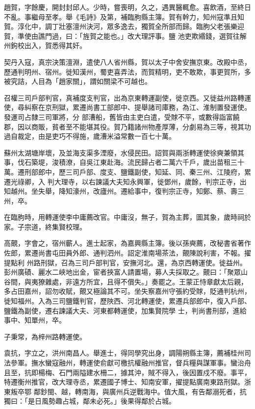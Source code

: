 \begin{pinyinscope}
 趙賀，字餘慶，開封封邱人。少時，嘗喪明，久之，遇異醫輒愈。喜飲酒，至終日不亂。事繼母至孝。舉《毛詩》及第，補臨朐縣主簿。賀有幹力，知州寇準且知賀。淳化中，調丁壯塞澶州決河，眾多逸去，獨賀全所部而歸。臨朐父老張樂迎賀，準使由譙門過，曰：「旌賀之能也。」改大理評事。鹽
 池吏欺緡錢，選賀往解州鉤校出入，賀悉得其奸。



 契丹入寇，真宗決策澶淵，遣使八人省州縣，賀以太子中舍安撫京東。改殿中丞，歷通判明州、宿州。徙知漢州，蜀吏喜弄法，而賀精明，吏不敢欺，事更賀所，多被究詰，人目為「趙家關」，謂如關梁不可越也。



 召權三司戶部判官，真補度支判官，出為京東轉運副使，徙京西。又徙益州路轉運使，尋糾察在京刑獄，累遷尚書工部郎中、提舉諸司庫務，為江、淮制置發運使。發運司占隸三司軍將，分
 部漕船，舊皆由主吏白遣，受賕不平，或數得詣富饒郡，因以商販，貧者至不能堪其役。賀乃籍諸州物產厚薄，分劇易為三等，視其功過自裁定，由是吏巧不得施，歲漕米溢常數一百七十萬。



 蘇州太湖塘岸壞，及並海支渠多湮廢，水侵民田。詔賀與兩浙轉運使徐奭兼領其事，伐石築堤，浚積潦，自吳江東赴海。流民歸占者二萬六千戶，歲出苗租三十萬。遷刑部郎中，歷三司戶部、度支、鹽鐵副使，知延、同、秦三州、江陵府，累遷光祿卿，入
 判大理寺，以右諫議大夫知永興軍，徙鄧州，歲餘，判宗正寺，出知越州。坐失舉，降知濠州，改廬州。遷給事中，復判宗正寺，知鄭、蔡、壽三州，卒。



 在臨朐時，用轉運使李中庸薦改官。中庸沒，無子，賀為主葬，圖其象，歲時祠於家。子宗道，終集賢校理。



 高覿，字會之，宿州蘄人。進士起家，為嘉興縣主簿。後以孫奭薦，改秘書省著作佐郎，累遷尚書屯田員外郎、通判泗州。詔定淮南場茶法，覿陳說利害，不報。擢提點利
 州路刑獄，召為三司戶部判官，安撫河北。還，為京西轉運使。徙益州。彭州廣磧、麗水二峽地出金，宦者挾富人請置場，募人夫採取之。覿曰：「聚眾山谷間，與夷獠雜處，非遠方所宜，且得不償失。」奏罷之。王蒙正恃章獻太后親，多占田嘉州，詔勿收賦，覿又極論其不可。坐失察嘉州守張約受賕，貶通判杭州，徙知福州。入為三司鹽鐵判官，歷陜西、河北轉運使，累遷兵部郎中，復入戶部、鹽鐵為副使，遷右諫議大夫、河東都轉運使，加集賢院學
 士，判尚書刑部，進給事中、知單州，卒。



 子秉常，為梓州路轉運使。



 袁抗，字立之，洪州南昌人。舉進士，得同學究出身，調陽朔縣主簿，薦補桂州司法參軍。撫水蠻寇融州，轉運使俞獻可檄抗權融州推官，督兵糧與謀軍事。蠻治舟且至，抗即楊梅、石門兩隘建水柵二，據其沖，賊不得入，後因置戍不廢。事平，特遷衡州推官，改大理寺丞，累遷國子博士、知南安軍，擢提點廣南東路刑獄。浙東叛卒鄂
 鄰鈔閩、越，轉南海，與廣州兵逆戰海中。值大風，有告鄰溺死者，抗獨曰：「是日風勢趣占城，鄰未必死。」後果得鄰於占城。




\end{pinyinscope}
